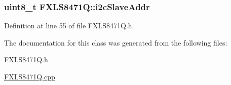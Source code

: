 \subsubsection[{\texorpdfstring{i2c\+Slave\+Addr}{i2cSlaveAddr}}]{\setlength{\rightskip}{0pt plus 5cm}uint8\+\_\+t F\+X\+L\+S8471\+Q\+::i2c\+Slave\+Addr\hspace{0.3cm}{\ttfamily [private]}}\hypertarget{class_f_x_l_s8471_q_a4e1d91629c057575a8aecc5ec63b6237}{}\label{class_f_x_l_s8471_q_a4e1d91629c057575a8aecc5ec63b6237}


Definition at line 55 of file F\+X\+L\+S8471\+Q.\+h.



The documentation for this class was generated from the following files\+:\begin{DoxyCompactItemize}
\item 
\hyperlink{_f_x_l_s8471_q_8h}{F\+X\+L\+S8471\+Q.\+h}\item 
\hyperlink{_f_x_l_s8471_q_8cpp}{F\+X\+L\+S8471\+Q.\+cpp}\end{DoxyCompactItemize}

